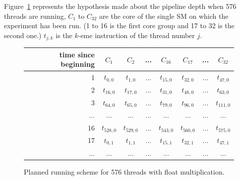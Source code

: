 \documentclass{report}
\begin{document}
    Figure~\ref{fig:fp_prediction_512}
    represents the hypothesis made about the pipeline depth when 576 threads are running, $C_1$ to
    $C_{32}$ are the core of the single SM on which the experiment has been run. (1 to 16 is the
    first core group and 17 to 32 is the second one.) $t_{j,k}$ is the $k$-eme instruction of the thread number $j$. 
        \begin{figure}[H]
      \centering
       \begin{tabular}{ | r || c | c | c | c || c | c | c | }
    	    \hline
    	    time since beginning & $C_1$ & $C_2$ & ... & $C_{16}$ & $C_{17}$ & ... & $C_{32}$ \\ \hline  \hline
    	   1 & $t_{0,0}$ & $t_{1,0}$ & ... & $t_{15,0}$ & $t_{32, 0}$ & ... & $t_{47, 0}$ \\ \hline 
    	   2 & $t_{16,0}$ & $t_{17,0}$ & ... & $t_{31,0}$ & $t_{48, 0}$ & ... & $t_{63, 0}$ \\ \hline
    	   3 & $t_{64,0}$ & $t_{65,0}$ & ... & $t_{79,0}$ & $t_{96, 0}$ & ... & $t_{111, 0}$ \\ \hline
    	   ... & ... & ... & ... & ... & ... & ... & ... \\ \hline
    	   16 & $t_{528,0}$ & $t_{529,0}$ & ... & $t_{543,0}$ & $t_{560,0}$ & ... & $t_{575, 0}$ \\ \hline
    	   17 & $t_{0,1}$ & $t_{1,1}$ & ... & $t_{15,1}$ & $t_{32, 1}$ & ... & $t_{47, 1}$ \\ \hline
    	   ... & ... & ... & ... & ... & ... & ... & ... \\ \hline
  	\end{tabular}
  	\captionsetup{justification=centering}
  	\caption{Planned running scheme for 576 threads with float multiplication.}
  	\label{fig:fp_prediction_512}
   \end{figure}
   
\end{document}
